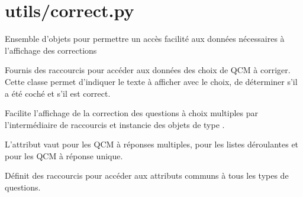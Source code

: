 \documentclass[a4,10pt,french]{sphinxmanual}
\begin{document}
\section{utils/correct.py}
\label{source:module-quiz.utils.correct}\label{source:utils-correct-py}
Ensemble d'objets pour permettre un accès facilité aux données nécessaires à
l'affichage des corrections

\begin{fulllineitems}
\label{source:quiz.utils.correct.CorrectChoice}
Fournis des raccourcis pour accéder aux données des choix de QCM à corriger.
Cette classe permet d'indiquer le texte à afficher avec le choix, de déterminer
s'il a été coché et s'il est correct.

\end{fulllineitems}


\begin{fulllineitems}
\label{source:quiz.utils.correct.CorrectQcm}
Facilite l'affichage de la correction des questions à choix multiples par
l'intermédiaire de raccourcis et instancie des objets de type {\hyperref[source:quiz.utils.correct.CorrectChoice]{\emph{}}}.

L'attribut  vaut  pour les QCM à réponses multiples,  pour
les listes déroulantes et  pour les QCM à réponse unique.

\end{fulllineitems}


\begin{fulllineitems}
\label{source:quiz.utils.correct.CorrectQuestion}
Définit des raccourcis pour accéder aux attributs communs à tous les types
de questions.

\end{fulllineitems}

\end{document}
